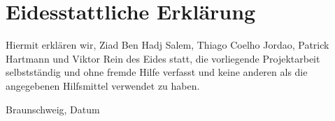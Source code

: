 \chapter*{Eidesstattliche Erklärung}\label{s:eid_erkl}


Hiermit erklären wir, Ziad Ben Hadj Salem, Thiago Coelho Jordao, Patrick Hartmann und Viktor Rein des Eides statt, die vorliegende Projektarbeit selbstständig und ohne
fremde Hilfe verfasst und keine anderen als die angegebenen Hilfsmittel verwendet zu
haben.

\vspace*{3cm}
Braunschweig, Datum
